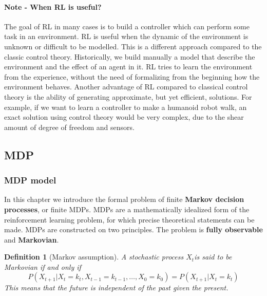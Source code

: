 \documentclass[main.tex]{subfiles}
\newtheorem{definition}{Definition}[section]
\begin{document}
\paragraph{Note - When RL is useful?} The goal of RL in many cases is to build a controller which can perform some task in an environment. RL is useful when the dynamic of the environment is unknown or difficult to be modelled. This is a different approach compared to the classic control theory. Historically, we build manually a model that describe the environment and the effect of an agent in it. RL tries to learn the environment from the experience, without the need of formalizing from the beginning how the environment behaves. Another advantage of RL compared to classical control theory is the ability of generating approximate, but yet efficient, solutions. For example, if we want to learn a controller to make a humanoid robot walk, an exact solution using control theory would be very complex, due to the shear amount of degree of freedom and sensors. 

\subsection{MDP}
\subsubsection{MDP model}
In this chapter we introduce the formal problem of finite \textbf{Markov decision processes}, or finite MDPs. MDPs are a mathematically idealized form of the reinforcement learning problem, for which precise theoretical statements can be made. MDPs are constructed on two principles. The problem is \textbf{fully observable} and \textbf{Markovian}.
\begin{definition}[Markov assumption]
A stochastic process $X_t$\footnotemark is said to be Markovian if and only if 
\begin{equation*}
    P(X_{t+1}|X_t=k_t,X_{t-1}=k_{t-1}, \dots, X_0=k_0) = P(X_{t+1}|X_{t}=k_t)
\end{equation*}
This means that the future is independent of the past given the present.
\end{definition}
\end{document}
